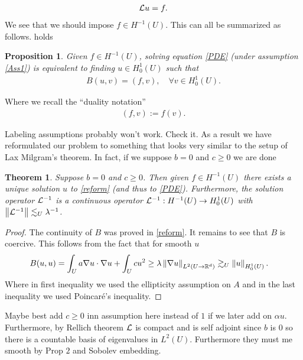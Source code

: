 \documentclass[12pt]{article}
\newtheorem{theorem}{Theorem}
\newtheorem{proposition}{Proposition}
\newcommand{\red}[1]{{\color{red}#1}}
\renewcommand{\norm}[1]{\left\lVert #1 \right\rVert}\renewcommand{\abs}[1]{\left| #1 \right|}
\begin{document}
\begin{align*}
	\mathcal{L} u=f.
\end{align*}
We see that we should impose $f \in H^{-1}(U)$. This can all be summarized as follows. holds
\begin{proposition}
	Given $f \in  H^{-1}(U)$, solving equation \eqref{PDE} (under assumption \ref{Ass1}) is equivalent to finding $u \in H_0^1(U)$ such that
	\begin{align}\label{reform}
		B(u,v)= (f,v) , \quad\forall v \in  H^{1}_0(U).
	\end{align}
\end{proposition}
Where we recall the ``duality notation''
\begin{align*}
	(f,v):= f(v) .
\end{align*}

\red{Labeling assumptions probably won't work. Check it.}
As a result we have reformulated our problem to something that looks very similar to the setup of Lax Milgram's theorem. In fact, if we suppose $b=0$ and $c \geq 0$ we are done
\begin{theorem}
	Suppose $b=0$  and $c \geq 0$. Then given $f \in  H^{-1}(U)$ there exists a unique solution $u$ to \eqref{reform} (and thus to \eqref{PDE}). Furthermore, the solution operator $\mathcal{L}^{-1}$ is a continuous operator	 $\mathcal{L}^{-1}: H^{-1}(U) \to H^1_0(U)$ with $\norm{\Ll^{-1}} \lesssim_U \lambda ^{-1}$.
\end{theorem}
\begin{proof}
	The continuity of $B$ was proved in  \eqref{reform}. It remains to see that $B$ is coercive. This follows from the fact that for smooth $u$
	\begin{align}\label{b=0}
		B(u,u) & = \int_{U}a \nabla u \cdot \nabla u + \int_{U} cu^2 \geq \lambda \norm{\nabla u}_{L^2(U \to \R^d)} \gtrsim_U \norm{u}_{H^1_0(U)}.
	\end{align}
	Where in first inequality we used the ellipticity assumption on $A$ and in the last inequality we used Poincaré's inequality.
\end{proof}
\red{Maybe best add $c \geq 0$ inn assumption here instead of $1$ if we later add on  $\alpha u$.}
Furthermore, by Rellich theorem $\mathcal{L}$ is compact and is self adjoint since $b$ is  $0$ so there is a countable basis of eigenvalues in  $L^2(U)$. Furthermore they must me smooth by Prop  $2$ and Sobolev embedding.
\end{document}
